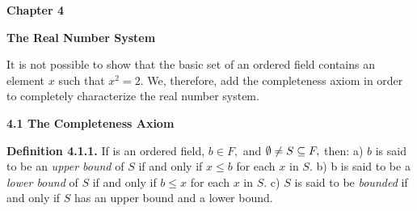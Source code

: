 %

\setlength{\topmargin}{-10pt}
\setlength{\voffset}{-40pt}
\setlength{\textheight}{700pt}





%
\setcounter{page}{62}
\textbf{Chapter 4}\nl

\textbf{The Real Number System} \nl

It is not possible to show that the basic set of an ordered field con­tains an element $x$
such that $x^{2} = 2.$ We, therefore, add the completeness axiom in order to completely
characterize the real number system. \nl

\textbf{4.1 The Completeness Axiom}\nl

\textbf{Definition 4.1.1.} If \of is an ordered field, $b\in F,$ and $\emptyset \neq S\subseteq F,$ then:\nl
a) $b$ is said to be an \textit{upper bound} of $S$ if and only if $x\leq b$ for each $x$ in $S.$\nl
b) b is said to be a \textit{lower bound} of $S$ if and only if $b\leq x$ for each $x$ in $S.$\nl
c) $S$ is said to be \textit{bounded} if and only if $S$ has an upper bound and a lower bound.\nl

